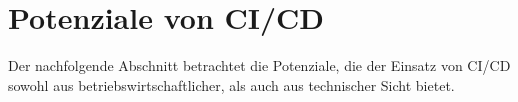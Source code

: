 \section{Potenziale von CI/CD}
\label{Potenziale von CI/CD}
Der nachfolgende Abschnitt betrachtet die Potenziale, die der Einsatz von \acrshort{CI}/\acrshort{CD} sowohl aus betriebswirtschaftlicher, als auch aus technischer Sicht bietet.